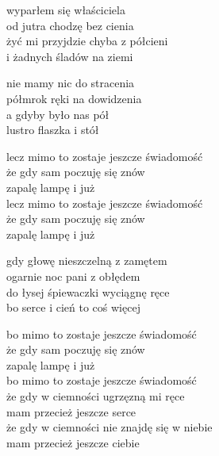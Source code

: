 \begin{textn}
    \chordfill
    wyparłem się właściciela\\
    od jutra chodzę bez cienia\\
    żyć mi przyjdzie chyba z półcieni\\
    i żadnych śladów na ziemi

    nie mamy nic do stracenia\\
    półmrok ręki na dowidzenia\\
    a gdyby było nas pół\\
    lustro flaszka i stół

    \vin lecz mimo to zostaje jeszcze świadomość\\
    \vin że gdy sam poczuję się znów\\
    \vin zapalę lampę i już\\
    \vin lecz mimo to zostaje jeszcze świadomość\\
    \vin że gdy sam poczuję się znów\\
    \vin zapalę lampę i już

    gdy głowę nieszczelną z zamętem\\
    ogarnie noc pani z obłędem\\
    do łysej śpiewaczki wyciągnę ręce\\
    bo serce i cień to coś więcej

    \vin bo mimo to zostaje jeszcze świadomość\\
    \vin że gdy sam poczuję się znów\\
    \vin zapalę lampę i już\\
    \vin bo mimo to zostaje jeszcze świadomość\\
    \vin że gdy w ciemności ugrzęzną mi ręce\\
    \vin mam przecież jeszcze serce\\
    \vin że gdy w ciemności nie znajdę się w niebie\\
    \vin mam przecież jeszcze ciebie
\end{textn}
